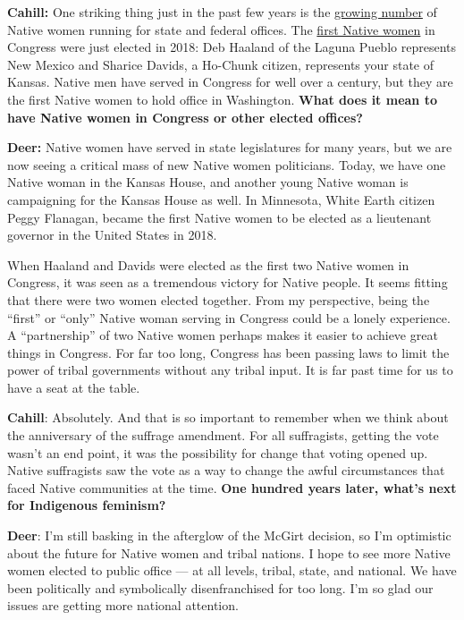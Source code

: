 \textbf{Cahill:} One striking thing just in the past few years is the
\href{https://www.npr.org/2018/07/04/625425037/record-number-of-native-americans-running-for-office-in-midterms}{growing
number} of Native women running for state and federal offices. The
\href{https://www.nytimes.com/2018/11/07/us/elections/native-americans-congress-haaland-davids.html}{first
Native women} in Congress were just elected in 2018: Deb Haaland of the
Laguna Pueblo represents New Mexico and Sharice Davids, a Ho-Chunk
citizen, represents your state of Kansas. Native men have served in
Congress for well over a century, but they are the first Native women to
hold office in Washington. \textbf{What does it mean to have Native
women in Congress or other elected offices?}

\textbf{Deer:} Native women have served in state legislatures for many
years, but we are now seeing a critical mass of new Native women
politicians. Today, we have one Native woman in the Kansas House, and
another young Native woman is campaigning for the Kansas House as well.
In Minnesota, White Earth citizen Peggy Flanagan, became the first
Native women to be elected as a lieutenant governor in the United States
in 2018.

When Haaland and Davids were elected as the first two Native women in
Congress, it was seen as a tremendous victory for Native people. It
seems fitting that there were two women elected together. From my
perspective, being the ``first'' or ``only'' Native woman serving in
Congress could be a lonely experience. A ``partnership'' of two Native
women perhaps makes it easier to achieve great things in Congress. For
far too long, Congress has been passing laws to limit the power of
tribal governments without any tribal input. It is far past time for us
to have a seat at the table.

\textbf{Cahill}: Absolutely. And that is so important to remember when
we think about the anniversary of the suffrage amendment. For all
suffragists, getting the vote wasn't an end point, it was the
possibility for change that voting opened up. Native suffragists saw the
vote as a way to change the awful circumstances that faced Native
communities at the time. \textbf{One hundred years later, what's next
for Indigenous feminism?}

\textbf{Deer}: I'm still basking in the afterglow of the McGirt
decision, so I'm optimistic about the future for Native women and tribal
nations. I hope to see more Native women elected to public office --- at
all levels, tribal, state, and national. We have been politically and
symbolically disenfranchised for too long. I'm so glad our issues are
getting more national attention.

